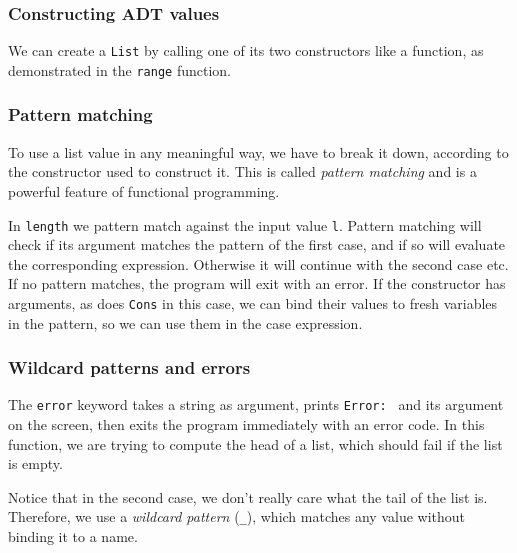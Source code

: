 \subsubsection{Constructing ADT values}

\begin{figure}[h!]
    
\end{figure}

We can create a \lstinline{List} by calling one of its two constructors like a function,
as demonstrated in the \lstinline{range} function.

\subsubsection{Pattern matching}

\begin{figure}[h!]
    
\end{figure}

To use a list value in any meaningful way,
we have to break it down, according to the constructor used to construct it.
This is called \emph{pattern matching} and is a powerful feature of functional programming.

In \lstinline{length} we pattern match against the input value \lstinline{l}.
Pattern matching will check if its argument matches the pattern of the first case,
and if so will evaluate the corresponding expression.
Otherwise it will continue with the second case etc.
If no pattern matches, the program will exit with an error.
If the constructor has arguments, as does \lstinline{Cons} in this case,
we can bind their values to fresh variables in the pattern,
so we can use them in the case expression.

\subsubsection{Wildcard patterns and errors}

\begin{figure}[h]
    
\end{figure}

The \lstinline{error} keyword takes a string as argument,
prints \lstinline{Error: } and its argument on the screen,
then exits the program immediately with an error code.
In this function, we are trying to compute the head of a list,
which should fail if the list is empty.

Notice that in the second case,
we don't really care what the tail of the list is.
Therefore, we use a \emph{wildcard pattern} (\lstinline{_}),
which matches any value without binding it to a name.

